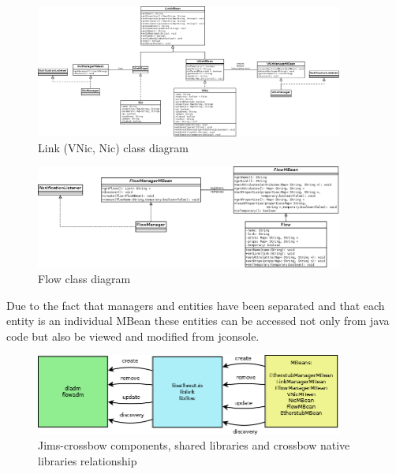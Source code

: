 \documentclass[11pt]{book}
\begin{document}
        \begin{figure}[H]
          \begin{center}
            \includegraphics[width=0.9\textwidth]{img/impl/link.png}
          \end{center}
          \caption{Link (VNic, Nic) class diagram}
        \end{figure}        

        \begin{figure}[H]
          \begin{center}
            \includegraphics[width=0.9\textwidth]{img/impl/flow.png}
          \end{center}
          \caption{Flow class diagram}
        \end{figure}        

		Due to the fact that managers and entities have been separated and that each entity is an individual MBean
		these entities can be accessed not only from java code but also be viewed and modified from jconsole.
		
		\begin{figure}[H]
          \begin{center}
            \includegraphics[width=0.9\textwidth]{img/impl/crossbowLibsDiagram.png}
          \end{center}
          \caption{Jims-crossbow components, shared libraries and crossbow native libraries relationship}
        \end{figure} 
\end{document}
